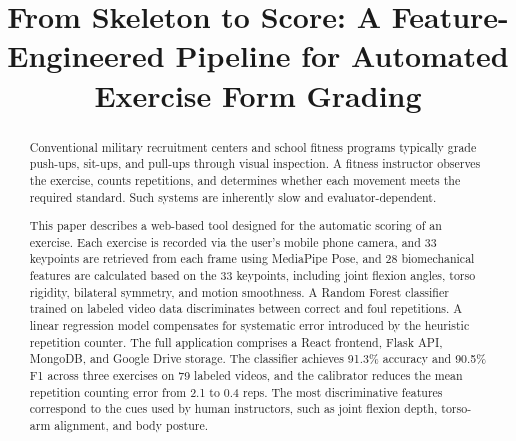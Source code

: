 \documentclass[conference]{IEEEtran}
\begin{document}
\title{From Skeleton to Score: A Feature-Engineered Pipeline for Automated Exercise Form Grading\\
}

\author{
\and
{}
}

\maketitle

\begin{abstract}
Conventional military recruitment centers and school fitness programs typically grade push-ups, sit-ups, and pull-ups through visual inspection. A fitness instructor observes the exercise, counts repetitions, and determines whether each movement meets the required standard. Such systems are inherently slow and evaluator-dependent.

This paper describes a web-based tool designed for the automatic scoring of an exercise. Each exercise is recorded via the user's mobile phone camera, and 33 keypoints are retrieved from each frame using MediaPipe Pose, and 28 biomechanical features are calculated based on the 33 keypoints, including joint flexion angles, torso rigidity, bilateral symmetry, and motion smoothness. A Random Forest classifier trained on labeled video data discriminates between correct and foul repetitions. A linear regression model compensates for systematic error introduced by the heuristic repetition counter. The full application comprises a React frontend, Flask API, MongoDB, and Google Drive storage. The classifier achieves 91.3\% accuracy and 90.5\% F1 across three exercises on 79 labeled videos, and the calibrator reduces the mean repetition counting error from 2.1 to 0.4 reps. The most discriminative features correspond to the cues used by human instructors, such as joint flexion depth, torso-arm alignment, and body posture.
\end{abstract}
\end{document}
